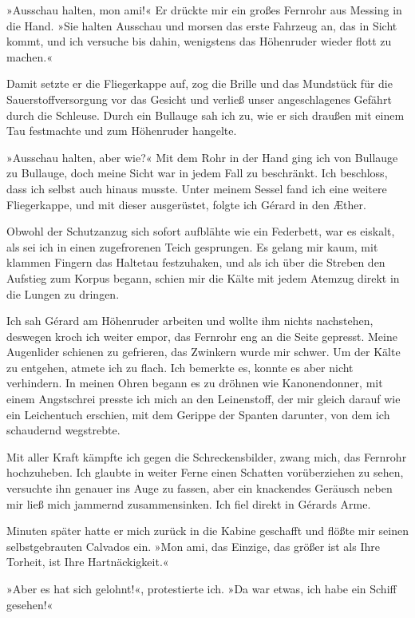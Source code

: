 »Ausschau halten, mon ami!« Er drückte mir ein großes Fernrohr aus
Messing in die Hand. »Sie halten Ausschau und morsen das erste
Fahrzeug an, das in Sicht kommt, und ich versuche bis dahin,
wenigstens das Höhenruder wieder flott zu machen.«

Damit setzte er die Fliegerkappe auf, zog die Brille und das
Mundstück für die Sauerstoffversorgung vor das Gesicht und verließ
unser angeschlagenes Gefährt durch die Schleuse. Durch ein Bullauge
sah ich zu, wie er sich draußen mit einem Tau festmachte und zum
Höhenruder hangelte.

»Ausschau halten, aber wie?« Mit dem Rohr in der Hand ging ich von
Bullauge zu Bullauge, doch meine Sicht war in jedem Fall zu
beschränkt. Ich beschloss, dass ich selbst auch hinaus musste.
Unter meinem Sessel fand ich eine weitere Fliegerkappe, und mit
dieser ausgerüstet, folgte ich Gérard in den Æther.

Obwohl der Schutzanzug sich sofort aufblähte wie ein Federbett, war
es eiskalt, als sei ich in einen zugefrorenen Teich gesprungen. Es
gelang mir kaum, mit klammen Fingern das Haltetau festzuhaken, und
als ich über die Streben den Aufstieg zum Korpus begann, schien mir
die Kälte mit jedem Atemzug direkt in die Lungen zu dringen.

Ich sah Gérard am Höhenruder arbeiten und wollte ihm nichts
nachstehen, deswegen kroch ich weiter empor, das Fernrohr eng an
die Seite gepresst. Meine Augenlider schienen zu gefrieren, das
Zwinkern wurde mir schwer. Um der Kälte zu entgehen, atmete ich zu
flach. Ich bemerkte es, konnte es aber nicht verhindern. In meinen
Ohren begann es zu dröhnen wie Kanonendonner, mit einem Angstschrei
presste ich mich an den Leinenstoff, der mir gleich darauf wie ein
Leichentuch erschien, mit dem Gerippe der Spanten darunter, von dem
ich schaudernd wegstrebte.

Mit aller Kraft kämpfte ich gegen die Schreckensbilder, zwang mich,
das Fernrohr hochzuheben. Ich glaubte in weiter Ferne einen
Schatten vorüberziehen zu sehen, versuchte ihn genauer ins Auge zu
fassen, aber ein knackendes Geräusch neben mir ließ mich jammernd
zusammensinken. Ich fiel direkt in Gérards Arme.

Minuten später hatte er mich zurück in die Kabine geschafft und
flößte mir seinen selbstgebrauten Calvados ein. »Mon ami, das
Einzige, das größer ist als Ihre Torheit, ist Ihre
Hartnäckigkeit.«

»Aber es hat sich gelohnt!«, protestierte ich. »Da war etwas, ich
habe ein Schiff gesehen!«

